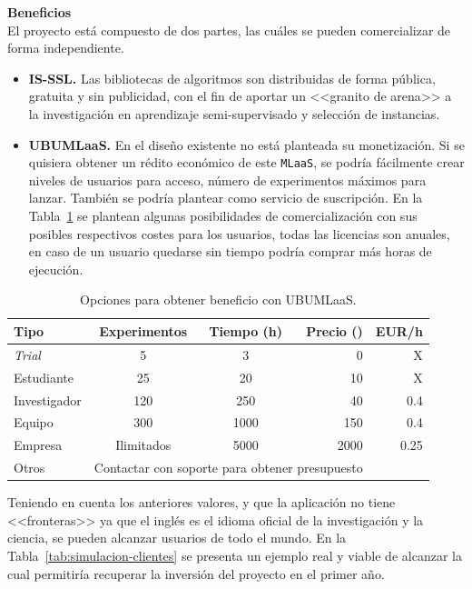 \textbf{Beneficios}\\
El proyecto está compuesto de dos partes, las cuáles se pueden comercializar de forma independiente.
\begin{itemize}
\item \textbf{IS-SSL.} Las bibliotecas de algoritmos son distribuidas de forma pública, gratuita y sin publicidad, con el fin de aportar un <<granito de arena>> a la investigación en aprendizaje semi-supervisado y selección de instancias.
\item \textbf{UBUMLaaS.} En el diseño existente no está planteada su monetización. Si se quisiera obtener un rédito económico de este \texttt{MLaaS}, se podría fácilmente crear niveles de usuarios para acceso, número de experimentos máximos para lanzar. También se podría plantear como servicio de suscripción. En la Tabla~\ref{tab:opciones-beneficio} se plantean algunas posibilidades de comercialización con sus posibles respectivos costes para los usuarios, todas las licencias son anuales, en caso de un usuario quedarse sin tiempo podría comprar más horas de ejecución.
\end{itemize}

\begin{table}[H]
\centering
\begin{tabular}{lccrr}
	\toprule
	\textbf{Tipo}          &\textbf{Experimentos} & \textbf{Tiempo (h)} & \textbf{Precio (\officialeuro)} &  EUR/h\\
	\midrule
	\textit{Trial}        & 5 & 3 & 0 & X\\
	Estudiante   & 25 & 20 & 10 & X\\
	Investigador  & 120 & 250 & 40 & 0.4 \\
	Equipo  & 300 & 1000 & 150 & 0.4 \\
	Empresa & Ilimitados & 5000 & 2000 & 0.25 \\
	Otros & \multicolumn{3}{c}{Contactar con soporte para obtener presupuesto} \\
	\bottomrule
\end{tabular}
\caption{Opciones para obtener beneficio con UBUMLaaS.}\label{tab:opciones-beneficio}
\end{table}

Teniendo en cuenta los anteriores valores, y que la aplicación no tiene <<fronteras>> ya que el inglés es el idioma oficial de la investigación y la ciencia, se pueden alcanzar usuarios de todo el mundo. En la Tabla~\ref{tab:simulacion-clientes} se presenta un ejemplo real y viable de alcanzar la cual permitiría recuperar la inversión del proyecto en el primer año.

